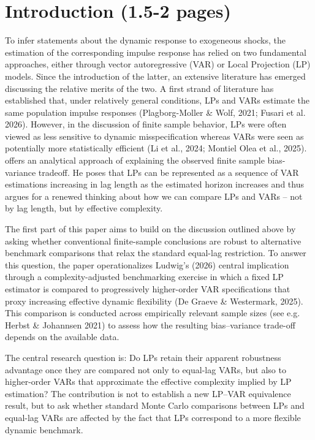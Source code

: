 

\section{Introduction (1.5-2 pages)}


To infer statements about the dynamic response to exogeneous shocks, the estimation of the corresponding impulse response has relied on two fundamental approaches, either through vector autoregressive (VAR) or Local Projection (LP) models. Since the introduction of the latter, an extensive literature has emerged discussing the relative merits of the two. A first strand of literature has established that, under relatively general conditions, LPs and VARs estimate the same population impulse responses (Plagborg-Moller \& Wolf, 2021; Fusari et al. 2026). However, in the discussion of finite sample behavior, LPs were often viewed as less sensitive to dynamic misspecification whereas VARs were seen as potentially more statistically efficient (Li et al., 2024; Montiel Olea et al., 2025). 
\textcite{ludwig2026local} offers an analytical approach of explaining the observed finite sample bias-variance tradeoff. He poses that LPs can be represented as a sequence of VAR estimations increasing in lag length as the estimated horizon increases and thus argues for a renewed thinking about how we can compare LPs and VARs – not by lag length, but by effective complexity. 

The first part of this paper aims to build on the discussion outlined above by asking whether conventional finite-sample conclusions are robust to alternative benchmark comparisons that relax the standard equal-lag restriction. To answer this question, the paper operationalizes Ludwig’s (2026) central implication through a complexity-adjusted benchmarking exercise in which a fixed LP estimator is compared to progressively higher-order VAR specifications that proxy increasing effective dynamic flexibility (De Graeve \& Westermark, 2025). This comparison is conducted across empirically relevant sample sizes (see e.g. Herbst \& Johannsen 2021) to assess how the resulting bias–variance trade-off depends on the available data. 

The central research question is: Do LPs retain their apparent robustness advantage once they are compared not only to equal-lag VARs, but also to higher-order VARs that approximate the effective complexity implied by LP estimation? The contribution is not to establish a new LP–VAR equivalence result, but to ask whether standard Monte Carlo comparisons between LPs and equal-lag VARs are affected by the fact that LPs correspond to a more flexible dynamic benchmark.

